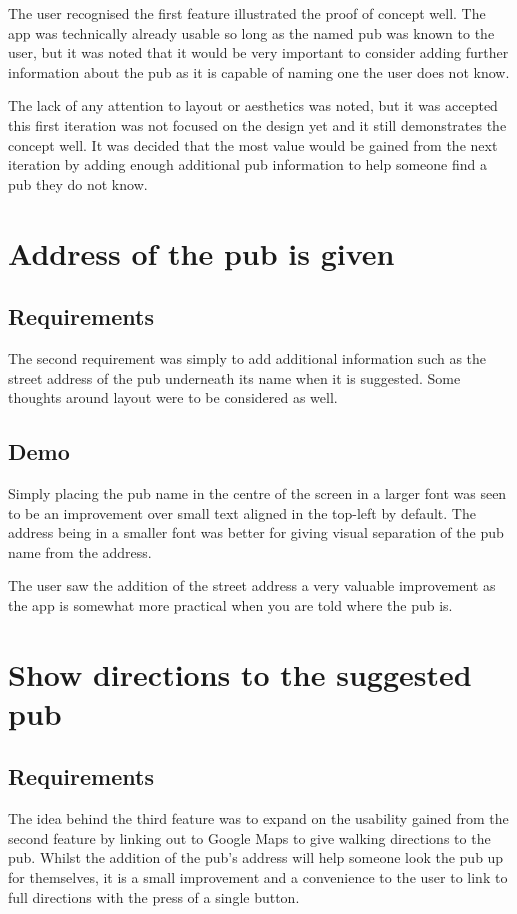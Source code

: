 \documentclass{report}
\begin{document}
The user recognised the first feature illustrated the proof of concept
well. The app was technically already usable so long as the named pub
was known to the user, but it was noted that it would be very important
to consider adding further information about the pub as it is capable
of naming one the user does not know.

The lack of any attention to layout or aesthetics was noted, but it was
accepted this first iteration was not focused on the design yet and it
still demonstrates the concept well. It was decided that the most
value would be gained from the next iteration by adding enough
additional pub information to help someone find a pub they do not know.

\section{ Address of the pub is given}
\subsection{Requirements}

The second requirement was simply to add additional information such as
the street address of the pub underneath its name when it is suggested.
Some thoughts around layout were to be considered as well.

\subsection{Demo}

Simply placing the pub name in the centre of the screen in a larger font
was seen to be an improvement over small text aligned in the top-left
by default. The address being in a smaller font was better for giving
visual separation of the pub name from the address.

The user saw the addition of the street address a very valuable improvement
as the app is somewhat more practical when you are told where the pub is.

\section{Show directions to the suggested pub}
\subsection{Requirements}

The idea behind the third feature was to expand on the usability gained
from the second feature by linking out to Google Maps to give walking
directions to the pub. Whilst the addition of the pub's address will
help someone look the pub up for themselves, it is a small improvement
and a convenience to the user to link to full directions with the press
of a single button.
\end{document}
